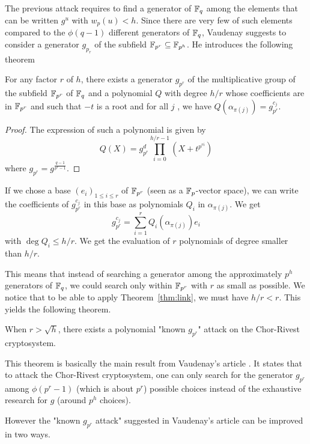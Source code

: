 \documentclass[12pt,a4paper,titlepage]{article}
\newcommand{\GF}[1]{\F_{#1}}
\begin{document}
The previous attack requires to find a generator of $\mathbb{F}_q$ among the elements that can be written $g^u$ with $w_p(u) < h$. Since there are very few of such elements compared to the $\phi(q-1)$ different generators of $\mathbb{F}_q$, Vaudenay suggests \cite{Vau01} to consider a generator $g_{p_r}$ of the subfield $\mathbb{F}_{p^r} \subseteq \mathbb{F}_{p^h}$. He introduces the following theorem
\begin{theorem}
For any factor $r$ of $h$, there exists a generator $g_{p^r}$ of the multiplicative group of the subfield $\mathbb{F}_{p^r}$ of $\mathbb{F}_q$ and a polynomial $Q$ with degree $h/r$ whose coefficients are in $\mathbb{F}_{p^r}$ and such that $-t$ is a root and for all $j$ , we have $Q(\alpha_{\pi(j)}) = g_{p^r}^{c_j}$.
\end{theorem}
\begin{proof}
The expression of such a polynomial is given by
$$ Q(X) = g_{p^r}^d \prod_{i=0}^{h/r-1} \left( X + t^{p^{ri}} \right) $$
where $g_{p^r} = g^{\frac{q-1}{p^r-1}}$. 
\end{proof}

If we chose a base $(e_i)_{1 \leq i \leq r}$ of $\GF{p^r}$ (seen as a $\mathbb{F}_p$-vector space), we can write the coefficients of $g_{p^r}^{c_j}$ in this base as polynomials $Q_i$ in $\alpha_{\pi(j)}$. We get
$$ g_{p^r}^{c_j} = \sum_{i=1}^r Q_i(\alpha_{\pi(j)}) e_i $$
with $\deg Q_i \leq h/r$. We get the evaluation of $r$ polynomials of degree smaller than $h/r$.

This means that instead of searching a generator among the approximately $p^h$ generators of $\mathbb{F}_q$, we could search only within $\mathbb{F}_{p^r}$ with $r$ as small as possible. We notice that to be able to apply Theorem~\ref{thm:link}, we must have $h/r < r$. This yields the following theorem.

\begin{theorem}
When $r > \sqrt{h}$, there exists a polynomial "known $g_{p^r}$" attack on the Chor-Rivest cryptosystem.
\end{theorem}

This theorem is basically the main result from Vaudenay's article \cite{Vau01}. It states that to attack the Chor-Rivest cryptosystem, one can only search for the generator $g_{p^r}$ among $\phi(p^r-1)$ (which is about $p^r$) possible choices instead of the exhaustive research for $g$ (around $p^h$ choices).

However the "known $g_{p^r}$ attack" suggested in Vaudenay's article can be improved in two ways.
\end{document}
